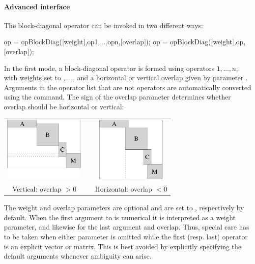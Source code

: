 \paragraph{Advanced interface} The block-diagonal operator can be
invoked in two different ways:
\begin{codeblock}
op = opBlockDiag([weight],op1,...,opn,[overlap]);
op = opBlockDiag([weight],op,[overlap]);
\end{codeblock}
In the first mode, a block-diagonal operator is formed using operators
$1,\ldots,n$, with weights set to
,$\ldots$,, and a horizontal or
vertical overlap given by parameter . Arguments in the
operator list that are not \spot{} operators are automatically
converted using the  command. The sign of the overlap
parameter determines whether overlap should be horizontal or vertical:
\begin{center}
\begin{tabular}{ccc}
\includegraphics[height=32mm]{./FigSparcoBlockDiag2} & &
\includegraphics[height=32mm]{./FigSparcoBlockDiag3} \\
Vertical: overlap $>0$ & &
Horizontal: overlap $< 0$
\end{tabular}
\end{center}
The weight and overlap parameters are optional and are set to
\mlcmd{[]}, respectively  by default. When the first argument
to  is numerical it is interpreted as a weight
parameter, and likewise for the last argument and overlap. Thus,
special care has to be taken when either parameter is omitted while
the first (resp. last) operator is an explicit vector or matrix. This
is best avoided by explicitly specifying the default arguments
whenever ambiguity can arise.

